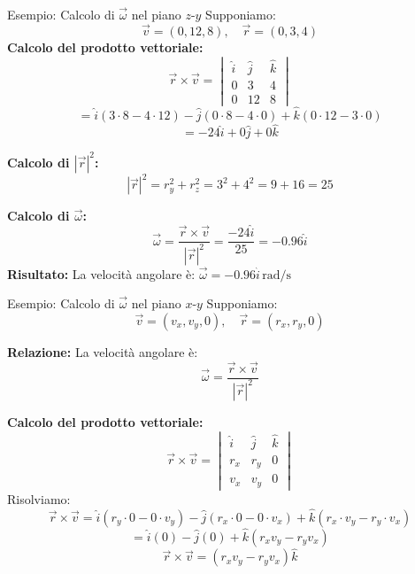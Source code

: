 \documentclass{beamer}
\begin{document}
\begin{frame}{Esempio: Calcolo di $\vec{\omega}$ nel piano $z$-$y$}
    Supponiamo:
$$
    \vec{v} = (0, 12, 8), \quad \vec{r} = (0, 3, 4)
$$
    \textbf{Calcolo del prodotto vettoriale:}
$$
    \vec{r} \times \vec{v} = \begin{vmatrix}
    \hat{i} & \hat{j} & \hat{k} \\
    0 & 3 & 4 \\
    0 & 12 & 8
    \end{vmatrix}
$$
$$
    = \hat{i} (3 \cdot 8 - 4 \cdot 12) - \hat{j} (0 \cdot 8 - 4 \cdot 0) + \hat{k} (0 \cdot 12 - 3 \cdot 0)
$$
$$
    = -24\hat{i} + 0\hat{j} + 0\hat{k}
$$

    \textbf{Calcolo di $|\vec{r}|^2$:}
$$
    |\vec{r}|^2 = r_y^2 + r_z^2 = 3^2 + 4^2 = 9 + 16 = 25
$$

    \textbf{Calcolo di $\vec{\omega}$:}
$$
    \vec{\omega} = \frac{\vec{r} \times \vec{v}}{|\vec{r}|^2} = \frac{-24\hat{i}}{25} = -0.96\hat{i}
$$
    \textbf{Risultato:} La velocità angolare è:
$
    \vec{\omega} = -0.96\hat{i} \, \mathrm{rad/s} $

\end{frame}

\begin{frame}{Esempio: Calcolo di \(\vec{\omega}\) nel piano \(x\)-\(y\)}
    Supponiamo:
    \[
    \vec{v} = (v_x, v_y, 0), \quad \vec{r} = (r_x, r_y, 0)
    \]

    \textbf{Relazione:}
    La velocità angolare è:
    \[
    \vec{\omega} = \frac{\vec{r} \times \vec{v}}{|\vec{r}|^2}
    \]

    \textbf{Calcolo del prodotto vettoriale:}
    \[
    \vec{r} \times \vec{v} = \begin{vmatrix}
    \hat{i} & \hat{j} & \hat{k} \\
    r_x & r_y & 0 \\
    v_x & v_y & 0
    \end{vmatrix}
    \]
    Risolviamo:
    \[
    \vec{r} \times \vec{v} = \hat{i}(r_y \cdot 0 - 0 \cdot v_y) - \hat{j}(r_x \cdot 0 - 0 \cdot v_x) + \hat{k}(r_x \cdot v_y - r_y \cdot v_x)
    \]
    \[
    = \hat{i}(0) - \hat{j}(0) + \hat{k}(r_x v_y - r_y v_x)
    \]
    \[
    \vec{r} \times \vec{v} = (r_x v_y - r_y v_x) \hat{k}
    \]
    \end{frame}
    
\end{document}
